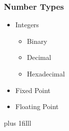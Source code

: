 \documentclass[fleqn]{beamer} %
\newcommand{\sectionIsubsectionIItitle}{Number Types}
\newcommand{\btVFill}{\vskip0pt plus 1filll}
\begin{document}
			\begin{frame}
				\frametitle{\sectionIsubsectionIItitle}\small
				\bigskip

				\begin{itemize}

					\item Integers 

						\begin{itemize}
							\item Binary
							\item Decimal
							\item Hexadecimal
						\end{itemize}

					\item Fixed Point 		

					\item Floating Point 



				\end{itemize}

				\btVFill
				

			\end{frame}
\end{document}
